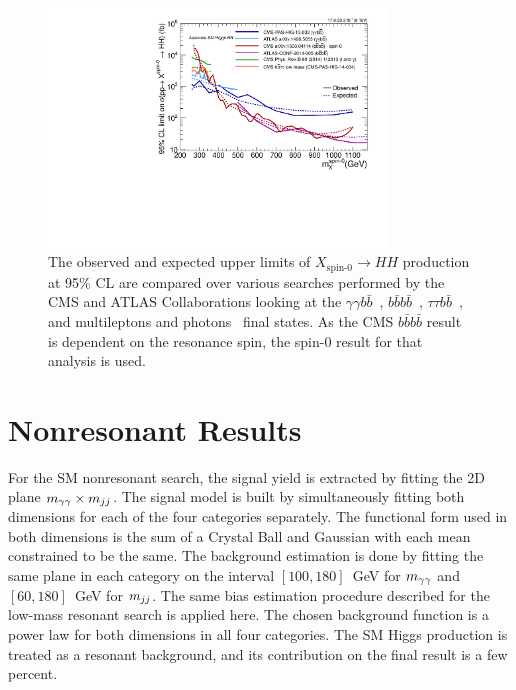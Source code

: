\begin{figure}[ht!]
 \begin{center}
   \includegraphics[width=0.8\textwidth]{figures/results/limit_comparison_all.pdf}
 \end{center}
\caption{The observed and expected upper limits of $X_\text{spin-0} \rightarrow HH$ production
at 95\% CL are compared over various searches performed by the CMS and ATLAS Collaborations
looking at the $\gamma \gamma b\bar{b}$~\cite{CMS-PAS-HIG-13-032,Aad:2014yja},
$b\bar{b}b\bar{b}$~\cite{Khachatryan:2015yea,ATLAS-CONF-2014-005},
$\tau\tau b\bar{b}$~\cite{CMS-PAS-HIG-14-034}, and
multileptons and photons~\cite{PhysRevD.90.112013}
final states. As the CMS $b\bar{b}b\bar{b}$ result is dependent on the
resonance spin, the spin-0 result for that analysis is used.}
\label{fig:limit_comp}
\end{figure}


\section{Nonresonant Results\label{sec:nonresresults}}

For the SM nonresonant search, the signal yield is extracted by fitting the 2D plane
$m_{\gamma\gamma} \times m_{jj}$. The signal model is built by simultaneously fitting both dimensions
for each of the four categories separately. The functional form used in both dimensions is the sum of a Crystal Ball and
Gaussian with each mean constrained to be the same. The background estimation is done by fitting
the same plane in each category on the interval $[100, 180]$~GeV for $m_{\gamma\gamma}$ and $[60, 180]$~GeV
for $m_{jj}$. The same bias estimation procedure
described for the low-mass resonant search is applied here. The chosen background function is a power
law for both dimensions in all four categories. The SM Higgs production is treated as a resonant
background, and its contribution on the final result is a few percent.

